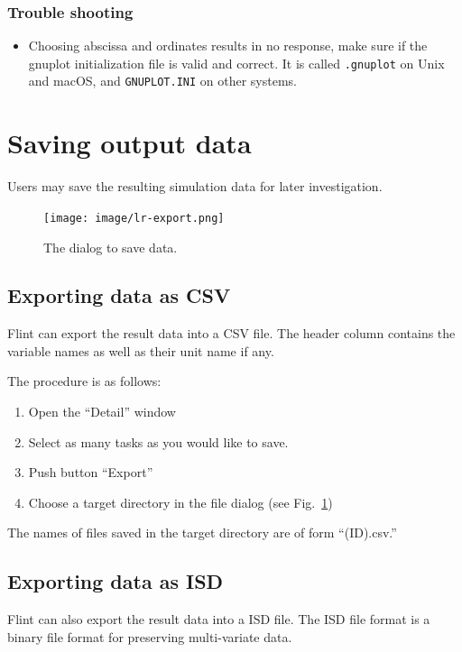 \documentclass[a4paper,10pt]{report}
\begin{document}
\subsubsection{Trouble shooting}
\label{sec:org503b6d0}

\begin{itemize}
\item Choosing abscissa and ordinates results in no response, make sure if the
gnuplot initialization file is valid and correct.
It is called \texttt{.gnuplot} on Unix and macOS, and \texttt{GNUPLOT.INI} on
other systems.
\end{itemize}


\section{Saving output data}
\label{sec:org357528f}
Users may save the resulting simulation data for later investigation.

\begin{figure}[htbp]
\centering
\texttt{[image: image/lr-export.png]}
\caption{\label{fig:orgc551bb3}The dialog to save data.}
\end{figure}

\subsection{Exporting data as CSV}
\label{sec:orgd3791af}
Flint can export the result data into a CSV file.
The header column contains the variable names as well as their unit name if any.

The procedure is as follows:

\begin{enumerate}
\item Open the ``Detail'' window
\item Select as many tasks as you would like to save.
\item Push button ``Export''
\item Choose a target directory in the file dialog (see Fig.~\ref{fig:orgc551bb3})
\end{enumerate}

The names of files saved in the target directory are of form ``(ID).csv.''

\subsection{Exporting data as ISD}
\label{sec:org57f9542}
Flint can also export the result data into a ISD file.
The ISD file format is a binary file format for preserving multi-variate data.
\end{document}
